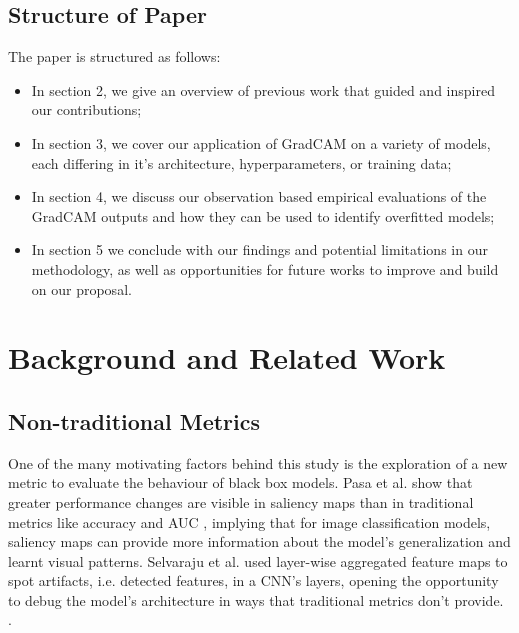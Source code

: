 \documentclass[conference]{IEEEtran}
\begin{document}
\subsection{Structure of Paper}
The paper is structured as follows:
\begin{itemize}
    \item In section 2, we give an overview of previous work that guided and inspired our contributions;
    \item In section 3, we cover our application of GradCAM on a variety of models, each differing in it's architecture, hyperparameters, or training data;
    \item In section 4, we discuss our observation based empirical evaluations of the GradCAM outputs and how they can be used to identify overfitted models;
    \item In section 5 we conclude with our findings and potential limitations in our methodology, as well as opportunities for future works to improve and build on our proposal. 
\end{itemize}


\section{Background and Related Work}
\label{gen_inst}
 \subsection{Non-traditional Metrics}
One of the many motivating factors behind this study is the exploration of a new metric to evaluate the behaviour of black box models. Pasa et al. show that greater performance changes are visible in saliency maps than in traditional metrics like accuracy and AUC \cite{fastchest}, implying that for image classification models, saliency maps can provide more information about the model's generalization and learnt visual patterns. Selvaraju et al. used layer-wise aggregated feature maps to spot artifacts, i.e. detected features, in a CNN's layers, opening the opportunity to debug the model's architecture in ways that traditional metrics don't provide.  \cite{debugcnn}.
\end{document}
